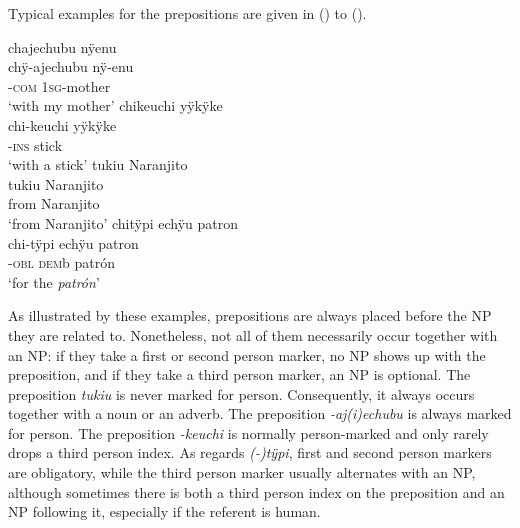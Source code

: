 Typical examples for the prepositions are given in () to ().

\ea\label{ex:new23-preps}
  \ea\label{ex:new23-preps.1}
\begingl
\glpreamble chajechubu nÿenu\\
\gla chÿ-ajechubu nÿ-enu\\
-\textsc{com} 1\textsc{sg}-mother\\
\glft ‘with my mother’
\endgl
\trailingcitation{[rxx-p181101l-2.044]}
  \ex\label{ex:new23-preps.2}
\begingl
\glpreamble chikeuchi yÿkÿke\\
\gla chi-keuchi yÿkÿke\\
-\textsc{ins} stick\\
\glft ‘with a stick’
\endgl
\trailingcitation{[jxx-p120430l-1.073]}
  \ex\label{ex:new23-preps.3}
\begingl
\glpreamble tukiu Naranjito\\
\gla tukiu Naranjito\\
\glb from Naranjito\\
\glft ‘from Naranjito’
\endgl
\trailingcitation{[mxx-p110825l.183]}
  \ex\label{ex:new23-preps.4}
\begingl
\glpreamble chitÿpi echÿu patron\\
\gla chi-tÿpi echÿu patron\\
-\textsc{obl} \textsc{dem}b patrón\\
\glft ‘for the \textit{patrón}’
\endgl
\trailingcitation{[mxx-p110825l.025]}
\z
\xe

As illustrated by these examples, prepositions are always placed before the NP they are related to. Nonetheless, not all of them necessarily occur together with an NP: if they take a first or second person marker, no NP shows up with the preposition, and if they take a third person marker, an NP is optional. The  preposition \textit{tukiu} is never marked for person. Consequently, it always occurs together with a noun or an adverb. The  preposition \textit{-aj(i)echubu} is always marked for person. The  preposition \textit{-keuchi} is normally person-marked and only rarely drops a third person index. As regards \textit{(-)tÿpi}, first and second person markers are obligatory, while the third person marker usually alternates with an NP, although sometimes there is both a third person index on the preposition and an NP following it, especially if the referent is human.

